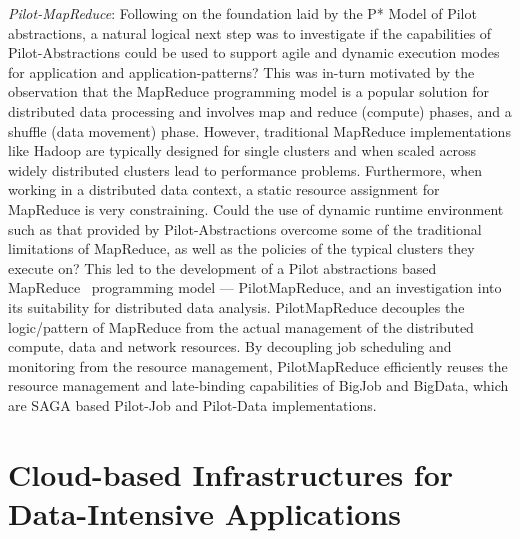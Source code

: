 \documentclass[times]{cpeauth}
\newcommand{\pilot}{Pilot\xspace}
\newcommand{\pilotmapreduce}{PilotMapReduce\xspace}
\begin{document}
{\it Pilot-MapReduce}: Following on the foundation laid by the P*
Model of Pilot abstractions, a natural logical next step was to
investigate if the capabilities of \pilot-Abstractions could be used
to support agile and dynamic execution modes for application and
application-patterns?  This was in-turn motivated by the observation
that the MapReduce programming model is a popular solution for
distributed data processing and involves map and reduce (compute)
phases, and a shuffle (data movement) phase. However, traditional
MapReduce implementations like Hadoop are typically designed for
single clusters and when scaled across widely distributed clusters
lead to performance problems.  Furthermore, when working in a
distributed data context, a static resource assignment for MapReduce
is very constraining.  Could the use of dynamic runtime environment
such as that provided by \pilot-Abstractions overcome some of the
traditional limitations of MapReduce, as well as the policies of the
typical clusters they execute on?  This led to the development of a
Pilot abstractions based
MapReduce~\cite{Mantha:2012:PEF:2287016.2287020} programming model ---
\pilotmapreduce, and an investigation into its suitability for
distributed data analysis.  \pilotmapreduce decouples the
logic/pattern of MapReduce from the actual management of the
distributed compute, data and network resources. By decoupling job
scheduling and monitoring from the resource management,
\pilotmapreduce efficiently reuses the resource management and
late-binding capabilities of BigJob and BigData, which are SAGA based
Pilot-Job and Pilot-Data implementations.


\section{Cloud-based Infrastructures for Data-Intensive Applications}
\end{document}
